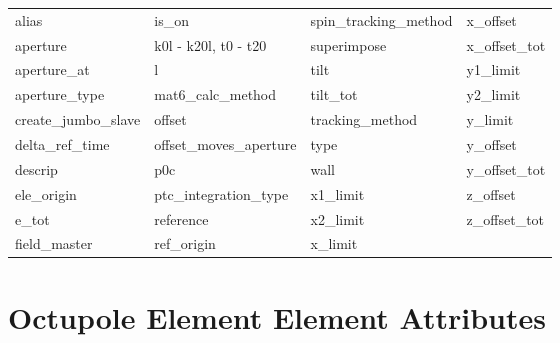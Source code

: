  \begin{tabular}{llll} \toprule
alias                       & is_on                       & spin_tracking_method        & x_offset                    \\
aperture                    & k0l - k20l, t0 - t20        & superimpose                 & x_offset_tot                \\
aperture_at                 & l                           & tilt                        & y1_limit                    \\
aperture_type               & mat6_calc_method            & tilt_tot                    & y2_limit                    \\
create_jumbo_slave          & offset                      & tracking_method             & y_limit                     \\
delta_ref_time              & offset_moves_aperture       & type                        & y_offset                    \\
descrip                     & p0c                         & wall                        & y_offset_tot                \\
ele_origin                  & ptc_integration_type        & x1_limit                    & z_offset                    \\
e_tot                       & reference                   & x2_limit                    & z_offset_tot                \\
field_master                & ref_origin                  & x_limit                     &                             \\
 \bottomrule
 \end{tabular}
 \vfill
 
 \section{Octupole Element Element Attributes}
 \label{s:list.octupole}
 
